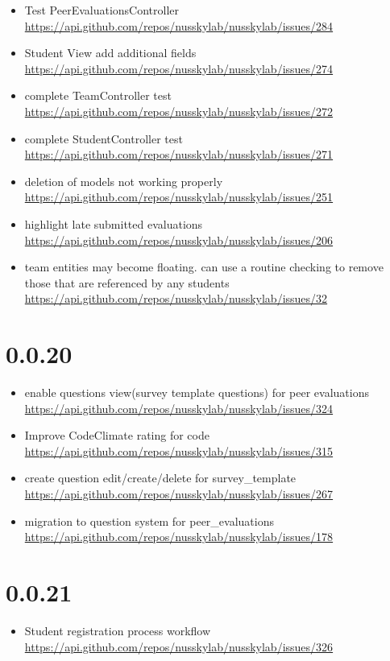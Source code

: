 {\begin{itemize}[noitemsep]
    \item Test PeerEvaluationsController \url{https://api.github.com/repos/nusskylab/nusskylab/issues/284} 
    \item Student View add additional fields \url{https://api.github.com/repos/nusskylab/nusskylab/issues/274} 
    \item complete TeamController test \url{https://api.github.com/repos/nusskylab/nusskylab/issues/272} 
    \item complete StudentController test \url{https://api.github.com/repos/nusskylab/nusskylab/issues/271} 
    \item deletion of models not working properly \url{https://api.github.com/repos/nusskylab/nusskylab/issues/251} 
    \item highlight late submitted evaluations \url{https://api.github.com/repos/nusskylab/nusskylab/issues/206} 
    \item team entities may become floating. can use a routine checking to remove those that are referenced by any students \url{https://api.github.com/repos/nusskylab/nusskylab/issues/32} 
\end{itemize}

\section{0.0.20}
\begin{itemize}[noitemsep]
    \item enable questions view(survey template questions) for peer evaluations \url{https://api.github.com/repos/nusskylab/nusskylab/issues/324} 
    \item Improve CodeClimate rating for code \url{https://api.github.com/repos/nusskylab/nusskylab/issues/315} 
    \item create question edit/create/delete for survey\_template \url{https://api.github.com/repos/nusskylab/nusskylab/issues/267} 
    \item migration to question system for peer\_evaluations \url{https://api.github.com/repos/nusskylab/nusskylab/issues/178} 
\end{itemize}

\section{0.0.21}
\begin{itemize}[noitemsep]
    \item Student registration process workflow \url{https://api.github.com/repos/nusskylab/nusskylab/issues/326} 
\end{itemize}

}
